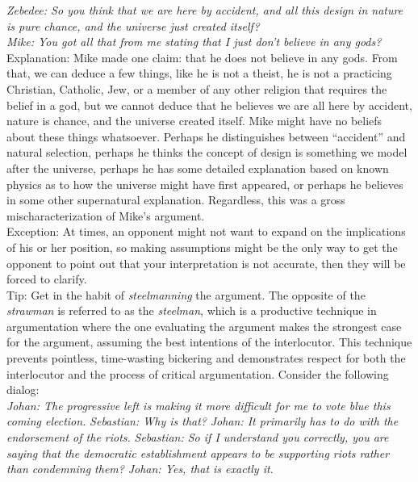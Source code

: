 \documentclass[a4paper,12pt,single,pdftex]{scrartcl}
\begin{document}
    
      {\em Zebedee: So you think that we are here by accident, and all this design in nature is pure chance, and the universe just created itself?}
    \\

    
      {\em Mike: You got all that from me stating that I just don’t believe in any gods?}
    \\

    
      Explanation: Mike made one claim: that he does not believe in any gods.  From that, we can deduce a few things, like he is not a theist, he is not a practicing Christian, Catholic, Jew, or a member of any other religion that requires the belief in a god, but we cannot deduce that he believes we are all here by accident, nature is chance, and the universe created itself.  Mike might have no beliefs about these things whatsoever.  Perhaps he distinguishes between “accident” and natural selection, perhaps he thinks the concept of design is something we model after the universe, perhaps he has some detailed explanation based on known physics as to how the universe might have first appeared, or perhaps he believes in some other supernatural explanation.  Regardless, this was a gross mischaracterization of Mike’s argument.
    \\

    
      Exception: At times, an opponent might not want to expand on the implications of his or her position, so making assumptions might be the only way to get the opponent to point out that your interpretation is not accurate, then they will be forced to clarify.
    \\

    
      Tip: Get in the habit of {\em steelmanning} the argument. The opposite of the {\em strawman} is referred to as the {\em steelman}, which is a productive technique in argumentation where the one evaluating the argument makes the strongest case for the argument, assuming the best intentions of the interlocutor. This technique prevents pointless, time-wasting bickering and demonstrates respect for both the interlocutor and the process of critical argumentation. Consider the following dialog:
    \\

    
      {\em Johan: The progressive left is making it more difficult for me to vote blue this coming election.} \newline
{\em Sebastian: Why is that?} \newline
{\em Johan: It primarily has to do with the endorsement of the riots.} \newline
{\em Sebastian: So if I understand you correctly, you are saying that the democratic establishment appears to be supporting riots rather than condemning them?} \newline
{\em Johan: Yes, that is exactly it.}
    \\
\end{document}
